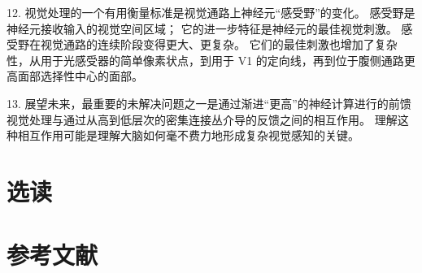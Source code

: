 12. 视觉处理的一个有用衡量标准是视觉通路上神经元“感受野”的变化。 感受野是神经元接收输入的视觉空间区域； 它的进一步特征是神经元的最佳视觉刺激。 感受野在视觉通路的连续阶段变得更大、更复杂。 它们的最佳刺激也增加了复杂性，从用于光感受器的简单像素状点，到用于 V1 的定向线，再到位于腹侧通路更高面部选择性中心的面部。 

13. 展望未来，最重要的未解决问题之一是通过渐进“更高”的神经计算进行的前馈视觉处理与通过从高到低层次的密集连接丛介导的反馈之间的相互作用。 理解这种相互作用可能是理解大脑如何毫不费力地形成复杂视觉感知的关键。

\section{选读}
\section{参考文献}